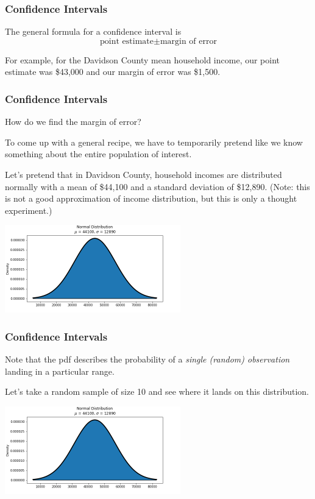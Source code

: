 \documentclass[11pt, table]{beamer}
\newcommand{\p}{\pause}
\begin{document}
\begin{frame}
\frametitle{Confidence Intervals}
The general formula for a confidence interval is
$$\text{point estimate} \pm \text{margin of error}$$
\vspace{0.25in}\p

For example, for the Davidson County mean household income, our point estimate was \$43,000 and our margin of error was \$1,500.
\end{frame}

\begin{frame}
\frametitle{Confidence Intervals}
How do we find the margin of error?
\vspace{0.2in}

To come up with a general recipe, we have to temporarily pretend like we know something about the entire population of interest.
\vspace{0.2in}

Let's pretend that in Davidson County, household incomes are distributed normally with a mean of \$44,100 and a standard deviation of \$12,890. (Note: this is not a good approximation of income distribution, but this is only a thought experiment.)

\begin{center}
\includegraphics[width = 3in]{images/income_plot.png}
\end{center}
\end{frame}

\begin{frame}
\frametitle{Confidence Intervals}

Note that the pdf describes the probability of a \emph{single (random) observation} landing in a particular range.

Let's take a random sample of size 10 and see where it lands on this distribution.
\begin{center}
\includegraphics[width = 3in]{images/income_plot.png}
\end{center}

\end{frame}
\end{document}
